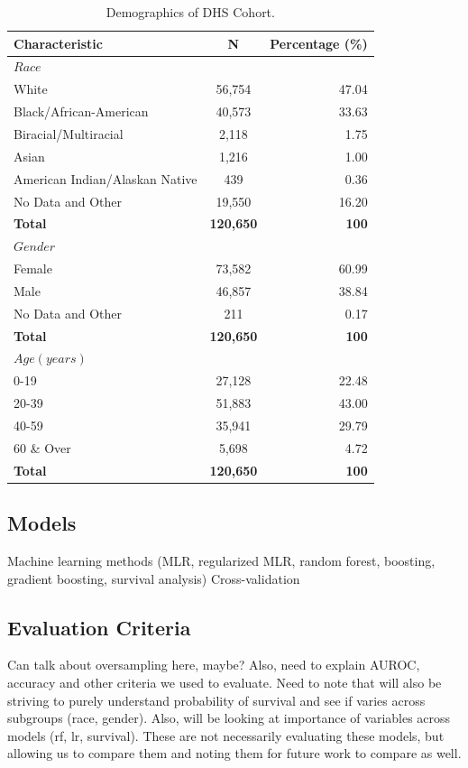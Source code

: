 \documentclass[twoside,10.5pt]{article}
\begin{document}
\begin{table}[h!]
  \begin{center}
    \caption{Demographics of DHS Cohort.}
    \label{tab:table1}
    \begin{tabular}{l|c|r} %
      \textbf{Characteristic} & \textbf{N} & \textbf{Percentage (\%)}\\
      \hline
      $Race$ & $ $ & $ $ \\
      White & 56,754 & 47.04\\
      Black/African-American & 40,573 & 33.63\\
      Biracial/Multiracial & 2,118 & 1.75\\
      Asian & 1,216 & 1.00\\
      American Indian/Alaskan Native & 439 & 0.36\\
      No Data and Other & 19,550 & 16.20\\
      \textbf{Total} & \textbf{120,650} & \textbf{100}\\
      \hline
      $Gender$ & $ $ & $ $ \\
      Female & 73,582 & 60.99\\
      Male & 46,857 & 38.84\\
      No Data and Other & 211 & 0.17\\
      \textbf{Total} & \textbf{120,650} & \textbf{100}\\
      $Age (years)$ & $ $ & $ $\\
      0-19 & 27,128 & 22.48\\
      20-39 & 51,883 & 43.00\\
      40-59 & 35,941 &  29.79\\
      60 \& Over & 5,698 &   4.72\\
      \textbf{Total} & \textbf{120,650} & \textbf{100}\\
    \end{tabular}
  \end{center}
\end{table}

\subsection{Models}
Machine learning methods (MLR, regularized MLR, random forest, boosting, gradient boosting, survival analysis)
Cross-validation

\subsection{Evaluation Criteria}
Can talk about oversampling here, maybe?
Also, need to explain AUROC, accuracy and other criteria we used to evaluate.
Need to note that will also be striving to purely understand probability of survival and see if varies across subgroups (race, gender). Also, will be looking at importance of variables across models (rf, lr, survival). These are not necessarily evaluating these models, but allowing us to compare them and noting them for future work to compare as well. 
\end{document}
